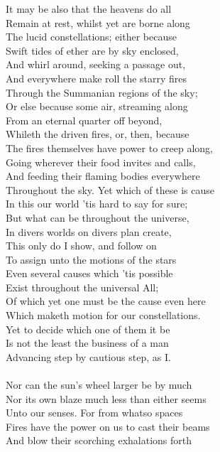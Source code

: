 It may be also that the heavens do all\\
Remain at rest, whilst yet are borne along\\
The lucid constellations; either because\\
Swift tides of ether are by sky enclosed,\\
And whirl around, seeking a passage out,\\
And everywhere make roll the starry fires\\
Through the Summanian regions of the sky;\\
Or else because some air, streaming along\\
From an eternal quarter off beyond,\\
Whileth the driven fires, or, then, because\\
The fires themselves have power to creep along,\\
Going wherever their food invites and calls,\\
And feeding their flaming bodies everywhere\\
Throughout the sky. Yet which of these is cause\\
In this our world 'tis hard to say for sure;\\
But what can be throughout the universe,\\
In divers worlds on divers plan create,\\
This only do I show, and follow on\\
To assign unto the motions of the stars\\
Even several causes which 'tis possible\\
Exist throughout the universal All;\\
Of which yet one must be the cause even here\\
Which maketh motion for our constellations.\\
Yet to decide which one of them it be\\
Is not the least the business of a man\\
Advancing step by cautious step, as I.\\
\\
Nor can the sun's wheel larger be by much\\
Nor its own blaze much less than either seems\\
Unto our senses. For from whatso spaces\\
Fires have the power on us to cast their beams\\
And blow their scorching exhalations forth\\
